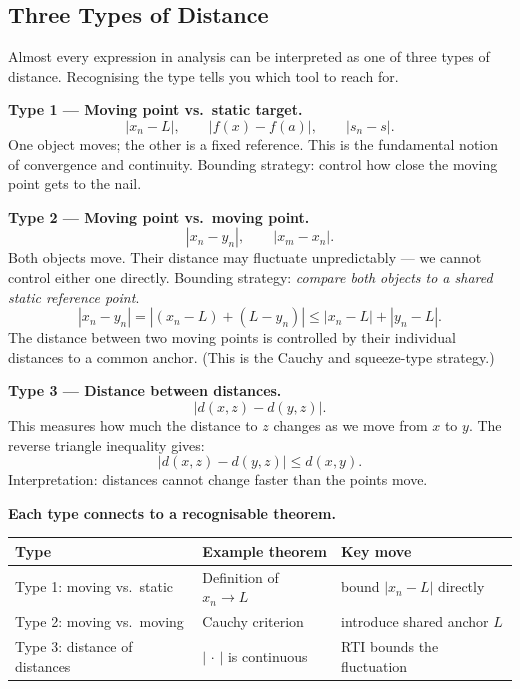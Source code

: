 \subsection{Three Types of Distance}
\label{sec:three-distance-types}

Almost every expression in analysis can be interpreted as one of three
types of distance. Recognising the type tells you which tool to reach for.

\medskip

\noindent\textbf{Type 1 — Moving point vs.\ static target.}
\[
  |x_n - L|, \qquad |f(x) - f(a)|, \qquad |s_n - s|.
\]
One object moves; the other is a fixed reference.
This is the fundamental notion of convergence and continuity.
Bounding strategy: control how close the moving point gets to the nail.

\medskip

\noindent\textbf{Type 2 — Moving point vs.\ moving point.}
\[
  |x_n - y_n|, \qquad |x_m - x_n|.
\]
Both objects move. Their distance may fluctuate unpredictably —
we cannot control either one directly.
Bounding strategy: \emph{compare both objects to a shared static
reference point}.
\[
  |x_n - y_n|
  = |(x_n - L) + (L - y_n)|
  \le |x_n - L| + |y_n - L|.
\]
The distance between two moving points is controlled by their
individual distances to a common anchor.
(This is the Cauchy and squeeze-type strategy.)

\medskip

\noindent\textbf{Type 3 — Distance between distances.}
\[
  \bigl|d(x,z) - d(y,z)\bigr|.
\]
This measures how much the distance to $z$ changes as we move from
$x$ to $y$.
The reverse triangle inequality gives:
\[
  \bigl|d(x,z) - d(y,z)\bigr| \le d(x,y).
\]
Interpretation: distances cannot change faster than the points move.

\medskip

\noindent\textbf{Each type connects to a recognisable theorem.}

\smallskip
\begin{center}
\renewcommand{\arraystretch}{1.4}
\begin{tabular}{l l l}
\toprule
\textbf{Type} & \textbf{Example theorem} & \textbf{Key move} \\
\midrule
Type 1: moving vs.\ static  & Definition of $x_n \to L$
  & bound $|x_n - L|$ directly \\
Type 2: moving vs.\ moving  & Cauchy criterion
  & introduce shared anchor $L$ \\
Type 3: distance of distances & $|\,\cdot\,|$ is continuous
  & RTI bounds the fluctuation \\
\bottomrule
\end{tabular}
\end{center}


